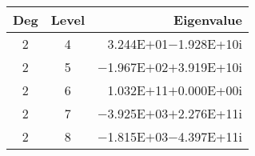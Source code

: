 \documentclass[a4paper]{article}
\begin{document}
\begin{table}
\begin{tabular}{c|c|r}
\toprule
\hline
Deg&Level &Eigenvalue \\ \hline\hline
2&4&3.244E$+$01$-$1.928E+10i\\
2&5&$-$1.967E$+$02$+$3.919E+10i\\
2&6&1.032E$+$11$+$0.000E+00i\\
2&7&$-$3.925E$+$03$+$2.276E+11i\\
2&8&$-$1.815E$+$03$-$4.397E+11i\\ \hline
\bottomrule
\end{tabular}
\end{table}
\end{document}
